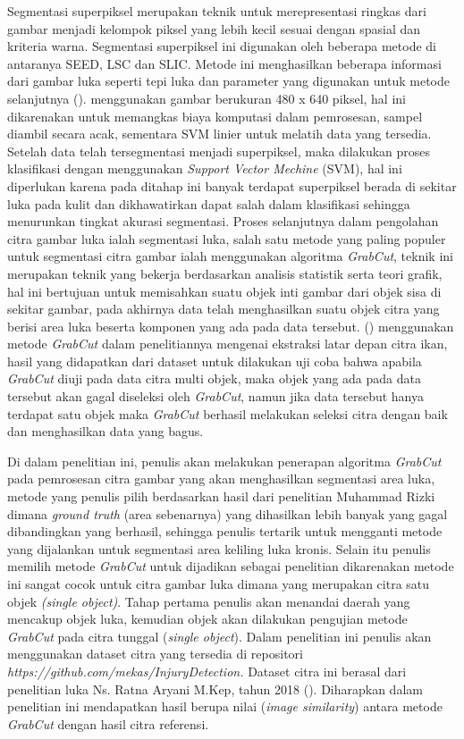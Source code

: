 Segmentasi superpiksel merupakan teknik untuk merepresentasi ringkas dari gambar 
menjadi kelompok piksel yang lebih kecil sesuai dengan spasial dan kriteria warna. 
Segmentasi superpiksel  ini digunakan oleh beberapa metode di antaranya SEED, LSC 
dan SLIC. Metode ini menghasilkan beberapa informasi dari gambar luka seperti tepi 
luka dan parameter yang digunakan untuk metode selanjutnya (\cite{Silva:2021}). 
\cite{Wang:2015} menggunakan gambar berukuran 480 x 640 piksel, hal ini dikarenakan 
untuk memangkas biaya komputasi dalam pemrosesan, sampel diambil secara acak, sementara 
SVM linier untuk melatih data yang tersedia. Setelah data telah tersegmentasi menjadi 
superpiksel, maka dilakukan proses klasifikasi dengan menggunakan \emph{Support Vector 
Mechine} (SVM), hal ini diperlukan karena pada ditahap ini banyak terdapat superpiksel 
berada di sekitar luka pada kulit dan dikhawatirkan dapat salah dalam klasifikasi 
sehingga menurunkan tingkat akurasi segmentasi. Proses selanjutnya dalam pengolahan 
citra gambar luka ialah segmentasi luka, salah satu metode yang paling populer untuk 
segmentasi citra gambar ialah menggunakan algoritma \emph{GrabCut}, teknik ini merupakan 
teknik yang bekerja berdasarkan analisis statistik serta teori grafik, hal ini 
bertujuan untuk memisahkan suatu objek inti gambar dari objek sisa di sekitar gambar, 
pada akhirnya data telah menghasilkan suatu objek citra yang berisi area luka beserta 
komponen yang ada pada data tersebut. (\cite{Nugraha:2022}) menggunakan metode 
\emph{GrabCut} dalam penelitiannya mengenai ekstraksi latar depan citra ikan, hasil yang 
didapatkan dari dataset untuk dilakukan uji coba bahwa apabila \emph{GrabCut} diuji pada 
data citra multi objek, maka objek yang ada pada data tersebut akan gagal diseleksi 
oleh \emph{GrabCut}, namun jika data tersebut hanya terdapat satu objek maka \emph{GrabCut} berhasil 
melakukan seleksi citra dengan baik dan menghasilkan data yang bagus.


Di dalam penelitian ini, penulis akan melakukan penerapan algoritma \emph{GrabCut} pada 
pemrosesan citra gambar yang akan menghasilkan segmentasi area luka, metode yang 
penulis pilih berdasarkan hasil dari penelitian Muhammad Rizki dimana \emph{ground truth} (area sebenarnya) 
yang dihasilkan lebih banyak yang gagal dibandingkan yang berhasil, sehingga penulis 
tertarik untuk mengganti metode yang dijalankan untuk segmentasi area keliling luka 
kronis. Selain itu penulis memilih metode \emph{GrabCut} untuk dijadikan sebagai 
penelitian dikarenakan metode ini sangat cocok untuk citra gambar luka dimana yang 
merupakan citra satu objek \emph{(single object)}. Tahap pertama penulis akan menandai 
daerah yang mencakup objek luka, kemudian objek akan dilakukan pengujian metode 
\emph{GrabCut} pada citra tunggal (\emph{single object}). Dalam penelitian ini 
penulis akan menggunakan dataset citra yang tersedia di repositori \emph{https://github.com/mekas/InjuryDetection.}
Dataset citra ini berasal dari penelitian luka Ns. Ratna Aryani M.Kep, tahun 2018 
(\cite{Aryani:2018}). Diharapkan dalam penelitian ini mendapatkan hasil berupa nilai 
(\emph{image similarity}) antara metode \emph{GrabCut} dengan hasil citra referensi.

